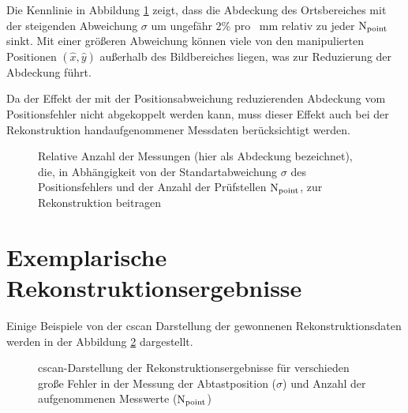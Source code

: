 Die Kennlinie in Abbildung \ref{fig:coverage} zeigt, dass die Abdeckung des Ortsbereiches mit der steigenden Abweichung $\sigma$ um ungefähr 2\% pro \SI{}{\milli\metre} relativ zu jeder $\operatorname{N}_{\operatorname{point}}$ sinkt. Mit einer größeren Abweichung können viele von den manipulierten Positionen $(\hat{x}, \hat{y})$ außerhalb des Bildbereiches liegen, was zur Reduzierung der Abdeckung führt. \par
Da der Effekt der mit der Positionsabweichung reduzierenden Abdeckung  vom Positionsfehler nicht abgekoppelt werden kann, muss dieser Effekt auch bei der Rekonstruktion handaufgenommener Messdaten berücksichtigt werden. \par
\begin{figure}[h!]
\begin{center}

\caption[Abdeckung des Ortsbereiches]{Relative Anzahl der Messungen (hier als Abdeckung bezeichnet), die, in Abhängigkeit von der Standartabweichung $\sigma$ des Positionsfehlers und der Anzahl der Prüfstellen $\operatorname{N}_{\operatorname{point}}$, zur Rekonstruktion beitragen}
\label{fig:coverage}
\end{center}
\end{figure}

\clearpage


\section{Exemplarische Rekonstruktionsergebnisse} \label{sec:posscan_recos}
Einige Beispiele von der \gls{cscan} Darstellung der gewonnenen Rekonstruktionsdaten werden in der Abbildung \ref{fig:posscan_cimgs} dargestellt. 
\begin{figure}
\centering

\caption[C-Scan-Darstellung mit Positionsabweichungen]{\gls{cscan}-Darstellung der Rekonstruktionsergebnisse für verschieden große Fehler in der Messung der Abtastposition ($\sigma$) und Anzahl der aufgenommenen Messwerte ($\operatorname{N}_{\operatorname{point}}$)}
\label{fig:posscan_cimgs}
\end{figure}
\clearpage



